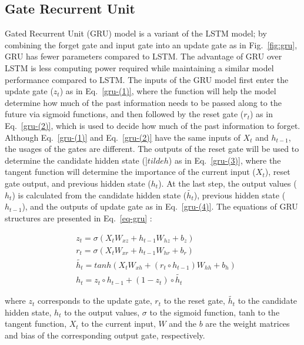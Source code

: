 \subsection{Gate Recurrent Unit}
Gated Recurrent Unit (GRU) model is a variant of the LSTM model; by combining the forget gate and input gate into an update gate as in Fig.~\ref{fig:gru}, GRU has fewer parameters compared to LSTM. The advantage of GRU over LSTM is less computing power required while maintaining a similar model performance compared to LSTM. The inputs of the GRU model first enter the update gate ($z_t$) as in Eq.~\ref{gru-(1)}, where the function will help the model determine how much of the past information needs to be passed along to the future via sigmoid functions, and then followed by the reset gate ($r_t$) as in Eq.~\ref{gru-(2)}, which is used to decide how much of the past information to forget. Although Eq.~\ref{gru-(1)} and Eq.~\ref{gru-(2)} have the same inputs of $X_t$ and $h_{t-1}$, the usages of the gates are different. The outputs of the reset gate will be used to determine the candidate hidden state ($]tilde{h}$) as in Eq.~\ref{gru-(3)}, where the tangent function will determine the importance of the current input ($X_t$), reset gate output, and previous hidden state ($h_t$). At the last step, the output values ($h_t$) is calculated from the candidate hidden state ($\tilde{h_t}$), previous hidden state ($h_{t-1}$), and the outputs of update gate as in Eq.~\ref{gru-(4)}. The equations of GRU structures are presented in Eq.~\ref{eq-gru} \citep{chengForecastingWastewaterTreatment2020}:

\begin{subequations} \label{eq-gru}
  \begin{align}
      &z_t=\sigma(X_tW_{xz}+h_{t-1}W_{hz}+b_z) \label{gru-(1)}\\
      &r_t=\sigma(X_tW_{xr}+h_{t-1}W_{hr}+b_r) \label{gru-(2)}\\
      &\tilde{h_t}=tanh(X_tW_{xh}+(r_t\circ h_{t-1})W_{hh}+b_h) \label{gru-(3)}\\
      &h_t=z_t\circ h_{t-1}+(1-z_t)\circ \tilde{h_t} \label{gru-(4)}
  \end{align}
\end{subequations}

\noindent
where $z_t$ corresponds to the update gate, $r_t$ to the reset gate, $\tilde{h_t}$ to the candidate hidden state, $h_t$ to the output values, $\sigma$ to the sigmoid function, tanh to the tangent function, $X_t$ to the current input, $W$ and the $b$ are the weight matrices and bias of the corresponding output gate, respectively.

